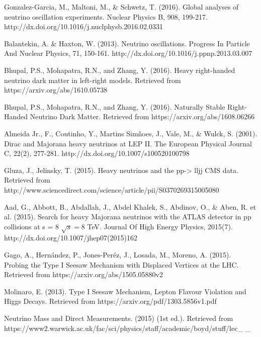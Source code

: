 \documentclass[11pt]{book}
\begin{document}
\begin{thebibliography}{10}

 Gonzalez-Garcia, M., Maltoni, M., \& Schwetz, T. (2016). Global analyses of neutrino oscillation experiments. Nuclear Physics B, 908, 199-217. http://dx.doi.org/10.1016/j.nuclphysb.2016.02.0331

 Balantekin, A. \& Haxton, W. (2013). Neutrino oscillations. Progress In Particle And Nuclear Physics, 71, 150-161. http://dx.doi.org/10.1016/j.ppnp.2013.03.007   
 
 Bhupal, P.S., Mohapatra, R.N., and Zhang, Y. (2016). Heavy right-handed neutrino dark matter in left-right models. Retrieved from https://arxiv.org/abs/1610.05738     

 Bhupal, P.S., Mohapatra, R.N., and Zhang, Y. (2016). Naturally Stable Right-Handed Neutrino Dark Matter. Retrieved from https://arxiv.org/abs/1608.06266

 Almeida Jr., F., Coutinho, Y., Martins Simñoes, J., Vale, M., \& Wulck, S. (2001). Dirac and Majorana heavy neutrinos at LEP II. The European Physical Journal C, 22(2), 277-281. http://dx.doi.org/10.1007/s100520100798  

  Gluza, J., Jelinsky, T. (2015). Heavy neutrinos and the pp-> lljj CMS data. Retrieved from http://www.sciencedirect.com/science/article/pii/S0370269315005080 

 Aad, G., Abbott, B., Abdallah, J., Abdel Khalek, S., Abdinov, O., \& Aben, R. et al. (2015). Search for heavy Majorana neutrinos with the ATLAS detector in pp collisions at s = 8 $ \sqrt{s}=8 $ TeV. Journal Of High Energy Physics, 2015(7). http://dx.doi.org/10.1007/jhep07(2015)162  

 Gago, A., Hernández, P., Jones-Peréz, J., Losada, M., Moreno, A. (2015). Probing the Type I Seesaw Mechanism with Displaced Vertices at the LHC. Retrieved from  https://arxiv.org/abs/1505.05880v2

 Molinaro, E. (2013). Type I Seesaw Mechanism, Lepton Flavour    	Violation and                                                                                                       Higgs Decays. Retrieved from https://arxiv.org/pdf/1303.5856v1.pdf

 Neutrino Mass and Direct Measurements. (2015) (1st ed.). Retrieved from https://www2.warwick.ac.uk/fac/sci/physics/staff/academic/boyd/stuff/lec\_ \_


\end{thebibliography}
\end{document}
